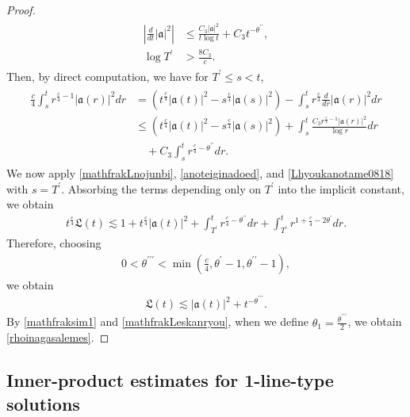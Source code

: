 \documentclass[10pt,a4paper]{amsart}
\numberwithin{equation}{section}
\begin{document}
\begin{proof}
\begin{align}\label{anoteiginadoed}
\begin{aligned}
\left|\frac{d}{dt}|\mathfrak{a}|^2\right|&\leq \frac{C_3|\mathfrak{a}|^2}{t\log{t}}+C_3t^{-\theta^{\prime \prime}},
\\
\log{T^{\prime}}&>\frac{8C_3}{c}.
\end{aligned}
\end{align}
Then, by direct computation, we have for $T^{\prime}\leq s<t$,
\begin{align}\label{Lhyoukanotame0818}
\begin{aligned}
\frac{c}{4}\int_s^tr^{\frac{c}{4}-1}|\mathfrak{a}(r)|^2dr&=\left(t^{\frac{c}{4}}|\mathfrak{a}(t)|^2-s^{\frac{c}{4}}|\mathfrak{a}(s)|^2\right)-\int_s^tr^{\frac{c}{4}}\frac{d}{dr}|\mathfrak{a}(r)|^2dr
\\
&\leq \left(t^{\frac{c}{4}}|\mathfrak{a}(t)|^2-s^{\frac{c}{4}}|\mathfrak{a}(s)|^2\right)+\int_s^t \frac{C_3r^{\frac{c}{4}-1}|\mathfrak{a}(r)|^2}{\log{r}}dr
\\
&\quad+C_3\int_s^t r^{\frac{c}{4}-\theta^{\prime \prime}}dr.
\end{aligned}
\end{align}
We now apply \eqref{mathfrakLnojunbi}, \eqref{anoteiginadoed}, and \eqref{Lhyoukanotame0818} with $s=T^{\prime}$. Absorbing the terms depending only on $T^{\prime}$ into the implicit constant, we obtain
\begin{align*}
t^{\frac{c}{4}}\mathfrak{L}(t)\lesssim 1+t^{\frac{c}{4}}|\mathfrak{a}(t)|^2+\int_{T^{\prime}}^t r^{\frac{c}{4}-\theta^{\prime\prime}}dr+\int_{T^{\prime}}^t r^{1+\frac{c}{4}-2\theta^{\prime}}dr.
\end{align*}
Therefore, choosing 
\begin{align*}
0<\theta^{\prime\prime\prime}<\min{(\frac{c}{4},\theta^{\prime}-1,\theta^{\prime\prime}-1)},
\end{align*}
we obtain
\begin{align}\label{mathfrakLeskanryou}
\mathfrak{L}(t)\lesssim |\mathfrak{a}(t)|^2+t^{-\theta^{\prime \prime \prime}}.
\end{align}
By \eqref{mathfraksim1} and \eqref{mathfrakLeskanryou}, when we define $\theta_1=\frac{\theta^{\prime \prime \prime}}{2}$, we obtain \eqref{rhoinagasalemes}.
\end{proof}




\subsection{Inner-product estimates for 1-line-type solutions}
\end{document}
